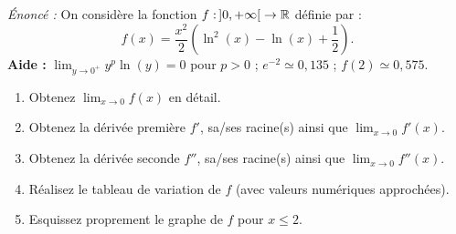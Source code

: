 \begin{exemple}
\emph{Énoncé :} On considère la fonction $f : \,]0, +\infty[ \;\to \mathbb{R}$ définie par :
\[
    f(x) = \frac{x^2}{2}\left(\ln^2(x) - \ln(x) + \frac{1}{2}\right).
\]
\textbf{Aide :} $\lim_{y \to 0^+} y^p\ln(y) = 0$ pour $p > 0$ ; $e^{-2} \simeq 0,135$ ; $f(2) \simeq 0,575$.
\begin{enumerate}[label=\alph*)]
    \item Obtenez $\lim_{x \to 0} f(x)$ en détail.
    \item Obtenez la dérivée première $f'$, sa/ses racine(s) ainsi que $\lim_{x \to 0} f'(x)$.
    \item Obtenez la dérivée seconde $f''$, sa/ses racine(s) ainsi que $\lim_{x \to 0} f''(x)$.
    \item Réalisez le tableau de variation de $f$ (avec valeurs numériques approchées).
    \item Esquissez proprement le graphe de $f$ pour $x \le 2$.
\end{enumerate}


\end{exemple}

